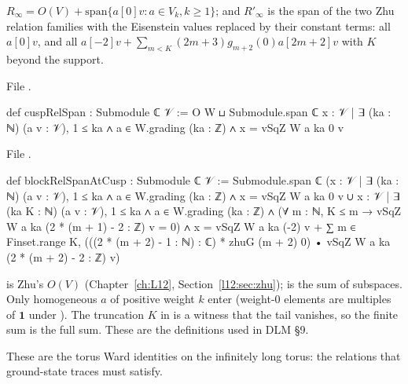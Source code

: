 \begin{definition}\label{l14:def:cuspRel}
$R_\infty = O(V) + \mathrm{span}\{a[0]v : a\in V_k, k\ge1\}$; and $R'_\infty$ is the span of the two Zhu relation families with
the Eisenstein values replaced by their constant terms: all $a[0]v$, and all
$a[-2]v + \sum_{m<K}(2m+3)g_{m+2}(0)a[2m+2]v$ with $K$ beyond the support.
\end{definition}
\noindent File .
\begin{leancode}
def cuspRelSpan : Submodule ℂ 𝒱 :=
  O W ⊔ Submodule.span ℂ
    {x : 𝒱 | ∃ (ka : ℕ) (a v : 𝒱), 1 ≤ ka ∧ a ∈ W.grading (ka : ℤ) ∧ x = vSqZ W a ka 0 v}
\end{leancode}
\noindent File .
\begin{leancode}
def blockRelSpanAtCusp : Submodule ℂ 𝒱 :=
  Submodule.span ℂ
    ({x : 𝒱 | ∃ (ka : ℕ) (a v : 𝒱), 1 ≤ ka ∧ a ∈ W.grading (ka : ℤ) ∧ x = vSqZ W a ka 0 v} ∪
     {x : 𝒱 | ∃ (ka K : ℕ) (a v : 𝒱), 1 ≤ ka ∧ a ∈ W.grading (ka : ℤ) ∧
        (∀ m : ℕ, K ≤ m → vSqZ W a ka (2 * (m + 1) - 2 : ℤ) v = 0) ∧
        x = vSqZ W a ka (-2) v + ∑ m ∈ Finset.range K,
              (((2 * (m + 2) - 1 : ℕ) : ℂ) * zhuG (m + 2) 0)
                • vSqZ W a ka (2 * (m + 2) - 2 : ℤ) v})
\end{leancode}
\begin{dictionary}
 is Zhu's $O(V)$ (Chapter~\ref{ch:L12}, Section~\ref{l12:sec:zhu});  is the sum of subspaces. Only
homogeneous $a$ of positive weight $k$ enter (weight-$0$ elements are multiples of $\mathbf 1$ under
). The truncation $K$ in  is a witness that the tail vanishes, so the finite
sum is the full sum. These are the definitions used in DLM §9.
\end{dictionary}
\begin{physics}
These are the torus Ward identities on the infinitely long torus: the relations that ground-state traces must satisfy.
\end{physics}


